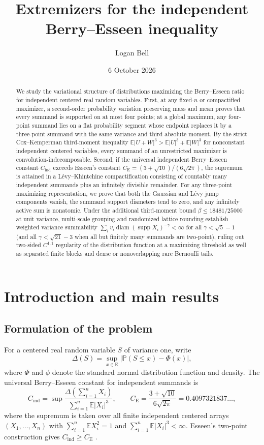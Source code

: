 \documentclass[11pt]{article}
\title{Extremizers for the independent Berry--Esseen inequality}
\author{Logan Bell}
\date{6 October 2026}
\numberwithin{equation}{section}
\theoremstyle{definition}
\DeclareMathOperator{\diam}{diam}
\DeclareMathOperator{\supp}{supp}
\newcommand{\E}{\mathbb E}
\newcommand{\Pp}{\mathbb P}
\newcommand{\R}{\mathbb R}
\newcommand{\ce}{C_{\mathrm E}}
\newcommand{\ci}{C_{\mathrm{ind}}}
\begin{document}
\maketitle
\begin{abstract}
We study the variational structure of distributions maximizing the
Berry--Esseen ratio for independent centered real random variables. First,
at any fixed-$n$ or compactified maximizer, a second-order probability
variation preserving mass and mean proves that every summand is supported on
at most four points; at a global maximum, any four-point summand lies on a
flat probability segment whose endpoint replaces it by a three-point summand
with the same variance and third absolute moment. By the strict
Cox--Kemperman third-moment inequality $\E|U+W|^3>\E|U|^3+\E|W|^3$ for
nonconstant independent centered variables, every summand of an unrestricted
maximizer is convolution-indecomposable. Second, if the universal independent
Berry--Esseen constant $\ci$ exceeds Esseen's constant
$\ce=(3+\sqrt{10})/(6\sqrt{2\pi})$, the supremum is attained in a
L\'evy--Khintchine compactification consisting of countably many independent
summands plus an infinitely divisible remainder. For any three-point
maximizing representation, we prove that both the Gaussian and L\'evy jump
components vanish, the summand support diameters tend to zero, and any
infinitely active sum is nonatomic. Under the additional third-moment bound
$\beta\le18481/25000$ at unit variance, multi-scale grouping and randomized
lattice rounding establish weighted variance summability
$\sum_i v_i\diam(\supp X_i)^{-\gamma}<\infty$ for all $\gamma<\sqrt5-1$ (and
all $\gamma<\sqrt{21}-3$ when all but finitely many summands are two-point),
ruling out two-sided $C^{1,1}$ regularity of the distribution function at a
maximizing threshold as well as separated finite blocks and dense or
nonoverlapping rare Bernoulli tails.
\end{abstract}
\tableofcontents

\section{Introduction and main results}\label{sec:statements}

\subsection{Formulation of the problem}

For a centered real random variable $S$ of variance one, write
\[
 \Delta(S)=\sup_{x\in\R}|\Pp(S\le x)-\Phi(x)|,
\]
where $\Phi$ and $\phi$ denote the standard normal distribution function and
density. The universal Berry--Esseen constant for independent summands is
\[
 \ci=\sup\frac{\Delta(\sum_{i=1}^nX_i)}
                        {\sum_{i=1}^n\E|X_i|^3},
 \qquad
 \ce=\frac{3+\sqrt{10}}{6\sqrt{2\pi}}=0.4097321837\ldots,
\]
where the supremum is taken over all finite independent centered arrays
$(X_1,\ldots,X_n)$ with $\sum_{i=1}^n\E X_i^2=1$ and $\sum_{i=1}^n\E|X_i|^3<\infty$.
Esseen's two-point construction gives $\ci\ge\ce$ \citep{Esseen1956,Shevtsova2013}.
\end{document}
